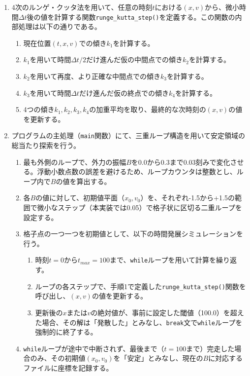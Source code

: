 \documentclass[dvipdfmx,a4paper]{jsarticle}
\newcommand{\code}[1]{\colorbox{inlinebackcolour}{\lstinline|#1|}}
\begin{document}
\begin{enumerate}
    \item 4次のルンゲ・クッタ法を用いて、任意の時刻$t$における$(x, v)$から、微小時間$\Delta t$後の値を計算する関数\code{runge_kutta_step()}を定義する。この関数の内部処理は以下の通りである。
    \begin{enumerate}
        \item 現在位置$(t, x, v)$での傾き$k_1$を計算する。
        \item $k_1$を用いて時間$\Delta t/2$だけ進んだ仮の中間点での傾き$k_2$を計算する。
        \item $k_2$を用いて再度、より正確な中間点での傾き$k_3$を計算する。
        \item $k_3$を用いて時間$\Delta t$だけ進んだ仮の終点での傾き$k_4$を計算する。
        \item 4つの傾き$k_1, k_2, k_3, k_4$の加重平均を取り、最終的な次時刻の$(x, v)$の値を更新する。
    \end{enumerate}
    
    \item プログラムの主処理（\code{main}関数）にて、三重ループ構造を用いて安定領域の総当たり探索を行う。
    \begin{enumerate}
        \item 最も外側のループで、外力の振幅$B$を$0.0$から$0.3$まで$0.03$刻みで変化させる。浮動小数点数の誤差を避けるため、ループカウンタは整数とし、ループ内で$B$の値を算出する。
        \item 各$B$の値に対して、初期値平面（$x_0, v_0$）を、それぞれ-1.5から+1.5の範囲で微小なステップ（本実装では0.05）で格子状に区切る二重ループを設定する。
        \item 格子点の一つ一つを初期値として、以下の時間発展シミュレーションを行う。
        \begin{enumerate}
            \item 時刻$t=0$から$t_{max}=100$まで、\code{while}ループを用いて計算を繰り返す。
            \item ループの各ステップで、手順1で定義した\code{runge_kutta_step()}関数を呼び出し、$(x, v)$の値を更新する。
            \item 更新後の$x$または$v$の絶対値が、事前に設定した閾値（100.0）を超えた場合、その解は「発散した」とみなし、\code{break}文で\code{while}ループを強制的に終了する。
        \end{enumerate}
        \item \code{while}ループが途中で中断されず、最後まで（$t=100$まで）完走した場合のみ、その初期値$(x_0, v_0)$を「安定」とみなし、現在の$B$に対応するファイルに座標を記録する。
    \end{enumerate}
\end{enumerate}
\end{document}
